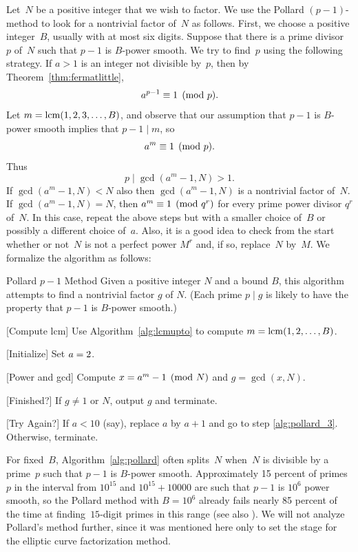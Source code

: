 Let~$N$ be a positive integer that we wish to factor.  We use the
Pollard $(p-1)$-method to look for a nontrivial factor of~$N$ as
follows.  First, we choose a positive integer~$B$, usually with at
most six digits.  Suppose that there is a prime divisor~$p$ of~$N$
such that $p-1$ is $B$-power smooth.  We try to find~$p$ using the
following strategy.  If $a>1$ is an integer not divisible by~$p$, then
by Theorem~\ref{thm:fermatlittle},
$$a^{p-1}\equiv 1\pmod{p}.$$
Let $m=\operatorname{lcm}(1,2,3,\ldots, B)$, and observe that our assumption that
$p-1$ is $B$-power smooth implies that $p-1\mid m$, so
$$
  a^m \equiv 1 \pmod{p}.
$$
Thus
$$
  p\mid \gcd(a^m-1,N) > 1.
$$
If $\gcd(a^m-1,N)<N$ also then $\gcd(a^m-1,N)$ is a nontrivial factor
of~$N$.
If $\gcd(a^m-1,N)=N$, then $a^m\equiv 1\pmod{q^r}$ for every prime power
divisor $q^r$ of~$N$.  In this case, repeat the above steps but with a
smaller choice of~$B$ or possibly a different choice of~$a$.
Also, it is a good idea to check from the
start whether or not~$N$ is not a perfect power $M^r$ and, if so,
replace~$N$ by~$M$. We formalize the algorithm as follows:

\begin{algorithm}{Pollard $p-1$ Method}\label{alg:pollard}
  Given a positive integer $N$ and a bound $B$, this algorithm
  attempts to find a nontrivial factor $g$ of $N$.  (Each prime $p\mid
  g$ is likely to have the property that $p-1$ is $B$-power smooth.)
\begin{steps}
\item{}[Compute lcm]
Use Algorithm~\ref{alg:lcmupto} to compute $m=\operatorname{lcm}(1,2,\ldots, B)$.
\item{}[Initialize] Set $a= 2$.
\item{}[Power and gcd]\label{alg:pollard_3}
Compute $x = a^m - 1\pmod{N}$
and $g=\gcd(x,N)$.
\item{}[Finished?]
If $g\neq 1$ or $N$, output $g$ and terminate.
\item{}[Try Again?] If $a<10$ (say), replace $a$ by $a+1$ and go to step
  \ref{alg:pollard_3}.  Otherwise, terminate.
\end{steps}
\end{algorithm}


For fixed~$B$, Algorithm~\ref{alg:pollard} often splits~$N$ when~$N$
is divisible by a prime~$p$ such that $p-1$ is $B$-power smooth.
Approximately 15 percent of primes~$p$ in the interval from $10^{15}$
and $10^{15}+10000$ are such that $p-1$ is $10^6$ power smooth, so the
Pollard method with $B=10^6$ already fails nearly 85 percent of the
time at finding~$15$-digit primes in this range (see also
).  We will not analyze Pollard's method
further, since it was mentioned here only to set the stage for the
elliptic curve factorization method.

